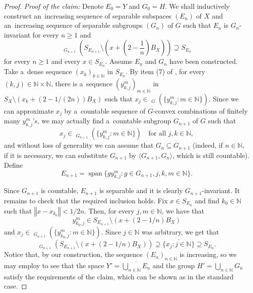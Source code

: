 \documentclass[a4paper,12pt]{amsart}
\theoremstyle{definition}
\theoremstyle{definition}
\theoremstyle{remark}
\numberwithin{equation}{section}
\newcommand{\N}{\mathbb{N}}
\newcommand{\clco}{\mathop{\overline{\mathrm{co}}}\nolimits}
\renewcommand{\geq}{\geqslant}
\newcommand{\<}{\langle}
\renewcommand{\>}{\rangle}
\newcommand{\norm}[1]{\left\Vert#1\right\Vert}
\newcommand{\clspan}{\overline{\operatorname{span}}}
\begin{document}
\begin{proof}
		\emph{Proof of the claim:}
		Denote $E_0 = Y$ and $G_0 = H$. We shall inductively construct an~increasing sequence of separable subspaces $(E_n)$ of $X$ and an~increasing sequence of separable subgroups $(G_n)$ of $G$ such that $E_n$ is $G_n$-invariant for every $n \geq 1$ and
		\begin{equation*}
			\clco_{G_{n+1}} \left( S_{E_{n+1}} \setminus \left( x + \left( 2 - \frac{1}{n} \right) B_X \right) \right) \supseteq S_{E_n}
		\end{equation*}
		for every $n \geq 1$ and every $x \in S_{E_n}$. Assume $E_n$ and $G_n$ have been constructed. Take a~dense sequence $(x_k)_{k \in \N}$ in $S_{E_n}$.
		By item (7) of , for every $(k,j) \in \N \times \N$, there is a~sequence $(y_{k,j}^m)_{m \in \N}$ in $S_X \setminus (x_k + (2 - 1/(2n)) B_X)$ such that $x_j \in \clco_G(\{y_{k,j}^m : m \in \N\})$. Since we can approximate $x_j$ by a~countable sequence of $G$-convex combinations of finitely many $y_{k,j}^m$'s, we may actually find a~countable subgroup $G_{n+1}$ of $G$  such that 
		\begin{equation*}
			x_j \in \clco_{G_{n+1}}(\{y_{k,j}^m : m \in \N\})
			\quad \text{for all } j,k \in \N,
		\end{equation*}
		and without loss of generality we can assume that $G_{n}\subseteq G_{n+1}$ (indeed, if $n \in \N$, if it is necessary, we can substitute $G_{n+1}$ by $\langle G_{n+1}, G_n\rangle$, which is still countable).
		Define
		\begin{equation*}
			E_{n+1} = \clspan \{ g y_{k, j}^m \colon g \in G_{n+1}, j, k, m \in \N \}.
		\end{equation*}
		
		Since $G_{n+1}$ is countable, $E_{n+1}$ is separable and it is clearly $G_{n+1}$-invariant.
		It remains to check that the required inclusion holds. Fix $x \in S_{E_n}$ and find $k_0 \in \N$ such that $\norm{x - x_{k_0}} < 1/2n$. Then, for every $j,m \in \N$, we have that
		\begin{equation*}
			y_{k_0, j}^m \in S_{E_{n+1}} \setminus (x + (2 - 1/n) B_X)
		\end{equation*}
		and $x_j \in \clco_{G_{n+1}}(\{y_{k_0, j}^m : m \in \N\})$.
		Since $j \in \N$ was arbitrary, we get that
		\begin{equation*}
			\clco_{G_{n+1}}(S_{E_{n+1}} \setminus (x + (2 - 1/n) B_X))
			\supseteq \overline{\{x_j: j \in \N\}}
			\supseteq S_{E_n}.
		\end{equation*}
		Notice that, by our construction, the sequence $(E_n)_{n\in \N}$ is increasing, so we may employ  to see that the space $Y' = \overline{\bigcup_{n \in \N} E_n}$ and the group $H' = \bigcup_{n \in \N} G_n$ satisfy the requirements of the claim, which can be shown as in the standard case.
		

\end{proof}
\end{document}
